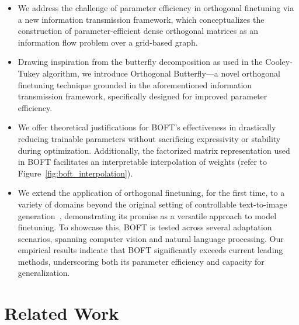 \begin{itemize}[leftmargin=*,nosep]
    \item We address the challenge of parameter efficiency in orthogonal finetuning via a new information transmission framework, which conceptualizes the construction of parameter-efficient dense orthogonal matrices as an information flow problem over a grid-based graph.
    \item Drawing inspiration from the butterfly decomposition as used in the Cooley-Tukey algorithm, we introduce Orthogonal Butterfly—a novel orthogonal finetuning technique grounded in the aforementioned information transmission framework, specifically designed for improved parameter efficiency.
    \item We offer theoretical justifications for BOFT’s effectiveness in drastically reducing trainable parameters without sacrificing expressivity or stability during optimization. Additionally, the factorized matrix representation used in BOFT facilitates an interpretable interpolation of weights (refer to Figure~\ref{fig:boft_interpolation}).
    \item We extend the application of orthogonal finetuning, for the first time, to a variety of domains beyond the original setting of controllable text-to-image generation~\cite{qiu2023controlling}, demonstrating its promise as a versatile approach to model finetuning. To showcase this, BOFT is tested across several adaptation scenarios, spanning computer vision and natural language processing. Our empirical results indicate that BOFT significantly exceeds current leading methods, underscoring both its parameter efficiency and capacity for generalization.
\end{itemize}

\section{Related Work}

